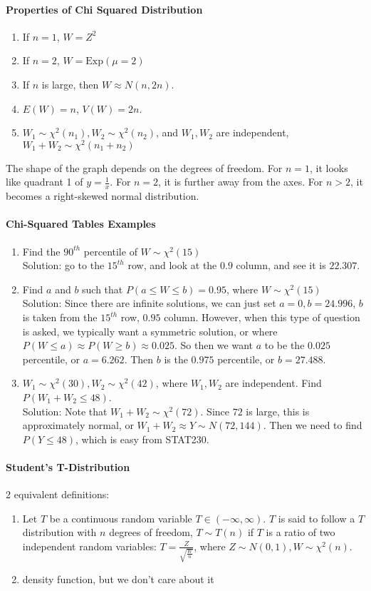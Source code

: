 \documentclass[10pt,letter]{article}
\theoremstyle{plain}
\theoremstyle{definition}
\begin{document}
\paragraph{Properties of Chi Squared Distribution}
\begin{enumerate}
    \item If $n=1$, $W=Z^2$ 
    \item If $n=2$, $W=\text{Exp}(\mu=2)$
    \item If $n$ is large, then $W\approx N(n,2n)$. 
    \item $E(W)=n$, $V(W)=2n$.
    \item $W_1\sim\chi^2(n_1),W_2\sim\chi^2(n_2)$, and $W_1,W_2$ are independent, $W_1+W_2\sim\chi^2(n_1+n_2)$ 
\end{enumerate}
The shape of the graph depends on the degrees of freedom. For $n=1$, it looks like quadrant 1 of $y=\frac{1}{x}$. For $n=2$, it is further away from the axes. For $n>2$, it becomes a right-skewed normal distribution. 

\paragraph{Chi-Squared Tables Examples}
\begin{enumerate}
    \item Find the $90^{th}$ percentile of $W\sim\chi^2(15)$ \\ 
    Solution: go to the $15^{th}$ row, and look at the $0.9$ column, and see it is $22.307$. 
    \item Find $a$ and $b$ such that $P(a\leq W\leq b)=0.95$, where $W\sim\chi^2(15)$ \\ 
    Solution: Since there are infinite solutions, we can just set $a=0,b=24.996$, $b$ is taken from the $15^{th}$ row, $0.95$ column. However, when this type of question is asked, we typically want a symmetric solution, or where $P(W\leq a)\approx P(W\geq b)\approx 0.025$. So then we want $a$ to be the $0.025$ percentile, or $a=6.262$. Then $b$ is the $0.975$ percentile, or $b=27.488$. 
    \item $W_1\sim\chi^2(30),W_2\sim\chi^2(42)$, where $W_1,W_2$ are independent. Find $P(W_1+W_2\leq48)$.\\ 
    Solution: Note that $W_1+W_2\sim\chi^2(72)$. Since $72$ is large, this is approximately normal, or $W_1+W_2\approx Y\sim N(72,144)$. Then we need to find $P(Y\leq 48)$, which is easy from STAT230. 
\end{enumerate}

\paragraph{Student's T-Distribution}
2 equivalent definitions: 
\begin{enumerate}
    \item Let $T$ be a continuous random variable $T\in(-\infty,\infty)$. $T$ is said to follow a $T$ distribution with $n$ degrees of freedom, $T\sim T(n)$ if $T$ is a ratio of two independent random variables: $T=\frac{Z}{\sqrt{\frac{W}{n}}}$, where $Z\sim N(0,1),W\sim\chi^2(n)$. 
    \item density function, but we don't care about it
\end{enumerate}
\end{document}

